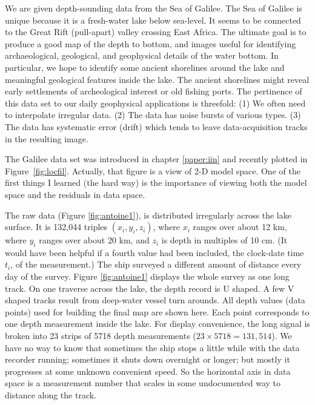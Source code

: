 \par

We are given depth-sounding data from the Sea of 
Galilee.  The Sea of Galilee is unique
because it is a fresh-water lake below sea-level.
It seems to be connected to the Great Rift (pull-apart)
valley crossing East Africa. The ultimate goal is to produce a good map of
the depth to bottom, and images useful for identifying archaeological,
geological, and geophysical details of the water bottom. In particular,
we hope to identify some ancient shorelines around the lake and meaningful 
geological features inside the lake. The ancient shorelines might
reveal early settlements of archeological interest or old fishing ports.
The pertinence of this data set to our daily geophysical applications is threefold:
(1) We often need to interpolate irregular data.
(2) The data has noise bursts of various types.
(3) The data has systematic error (drift)
which tends to leave data-acquisition tracks in the resulting image.

\par
The Galilee data set was introduced in chapter \ref{paper:iin}
and recently plotted in Figure~\ref{fig:locfil}.
Actually, that figure is a view of 2-D model space.
One of the first things I learned (the hard way) is the importance
of viewing both the model space and the residuals in data space.
\par
{}

\par
The raw data (Figure \ref{fig:antoine1}),
is distributed irregularly across the lake surface.
It is 132,044 triples $(x_i,y_i,z_i)$, where $x_i$ ranges over about 
12 km, where $y_i$ ranges over about 20 km,
and $z_i$ is depth in multiples of 10 cm.
(It would have been helpful if a fourth value had been included,
the clock-date time $t_i$, of the measurement.)
The ship surveyed a different amount of distance every day of the survey.
Figure \ref{fig:antoine1} displays the whole survey as one long track.
On one traverse across the lake, the depth record is U shaped.
A few V shaped tracks result from deep-water vessel turn arounds.
All depth values (data points) used for building the final map are shown here.
Each point corresponds to one depth measurement inside the lake.
For display convenience, the long signal is broken
into 23 strips of 5718 depth measurements
($23\times 5718 = 131,514$).
We have no way to know that sometimes the ship stops a little while
with the data recorder running;
sometimes it shuts down overnight or longer;
but mostly it progresses at some unknown convenient speed.
So the horizontal axis in data space is a measurement number
that scales in some undocumented way to distance along the track.

